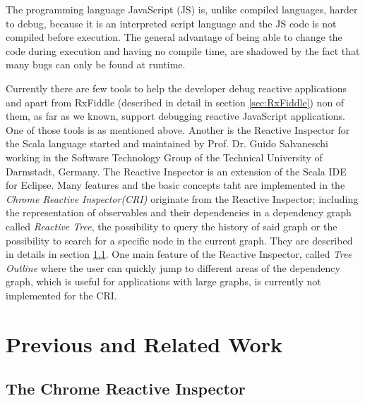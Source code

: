 
The programming language JavaScript (JS) is, unlike compiled languages, harder to debug, because it is an interpreted script language and the JS code is not compiled before execution. The general advantage of being able to change the code during execution and having no compile time, are shadowed by the fact that many bugs can only be found at runtime. 


Currently there are few tools to help the developer debug reactive applications and apart from RxFiddle (described in detail in section \ref{sec:RxFiddle}) non of them, as far as we known, support debugging reactive JavaScript applications. One of those tools is \cite{ShinyGraphFromLog} as mentioned above. Another is the Reactive Inspector for the Scala language \cite{ReactiveInspector} started and maintained by Prof. Dr. Guido Salvaneschi working in the Software Technology Group of the Technical University of Darmstadt, Germany.
The Reactive Inspector is an extension of the Scala IDE for Eclipse. Many features and the basic concepts taht are implemented in the \emph{Chrome Reactive Inspector(CRI)} originate from the Reactive Inspector; including the representation of observables and their dependencies in a dependency graph called \emph{Reactive Tree}, the possibility to query the history of said %
 graph or the possibility to search for a specific node in the current graph. They are described in details in section \ref{sec:PreviousCRI}. One main feature of the Reactive Inspector, called \emph{Tree Outline} where the user can quickly jump to different areas of the dependency graph, which is useful for applications with large graphs, is currently not implemented for the CRI.

\section{Previous and Related Work}
	\subsection{The Chrome Reactive Inspector}
	\label{sec:PreviousCRI}
